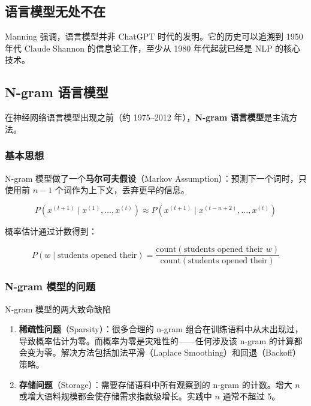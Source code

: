 \documentclass[a4paper]{article}
\begin{document}



\subsection{语言模型无处不在}

Manning 强调，语言模型并非 ChatGPT 时代的发明。它的历史可以追溯到 1950 年代 Claude Shannon 的信息论工作，至少从 1980 年代起就已经是 NLP 的核心技术。





\subsection{N-gram 语言模型}

在神经网络语言模型出现之前（约 1975--2012 年），\textbf{N-gram 语言模型}是主流方法。

\subsubsection{基本思想}

N-gram 模型做了一个\textbf{马尔可夫假设}（Markov Assumption）：预测下一个词时，只使用前 $n-1$ 个词作为上下文，丢弃更早的信息。

$$P(x^{(t+1)} \mid x^{(1)}, \ldots, x^{(t)}) \approx P(x^{(t+1)} \mid x^{(t-n+2)}, \ldots, x^{(t)})$$

概率估计通过计数得到：

$$P(w \mid \text{students opened their}) = \frac{\text{count}(\text{students opened their } w)}{\text{count}(\text{students opened their})}$$





\subsubsection{N-gram 模型的问题}

\begin{warningbox}{N-gram 模型的两大致命缺陷}
\begin{enumerate}
    \item \textbf{稀疏性问题}（Sparsity）：很多合理的 n-gram 组合在训练语料中从未出现过，导致概率估计为零。而概率为零是灾难性的——任何涉及该 n-gram 的计算都会变为零。解决方法包括加法平滑（Laplace Smoothing）和回退（Backoff）策略。
    \item \textbf{存储问题}（Storage）：需要存储语料中所有观察到的 n-gram 的计数。增大 $n$ 或增大语料规模都会使存储需求指数级增长。实践中 $n$ 通常不超过 5。
\end{enumerate}
\end{warningbox}
\end{document}

